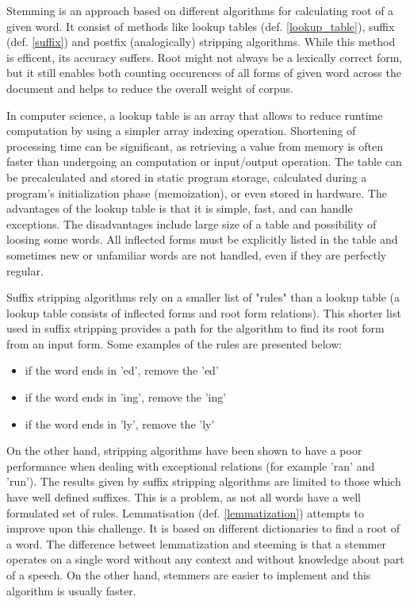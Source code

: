 Stemming is an approach based on different algorithms for calculating root of a given word. It consist of methods like lookup tables (def. \ref{lookup_table}), suffix (def. \ref{suffix}) and postfix (analogically) stripping algorithms. While this method is efficent, its accuracy suffers. Root might not always be a lexically correct form, but it still enables both counting occurences of all forms of given word across the document and helps to reduce the overall weight of corpus.

 \begin{definition}
 	\label{lookup_table}
In computer science, a lookup table is an array that allows to reduce runtime computation by using a simpler array indexing operation. Shortening of processing time can be significant, as retrieving a value from memory is often faster than undergoing an computation or input/output operation. The table can be precalculated and stored in static program storage, calculated during a program's initialization phase (memoization), or even stored in hardware.
The advantages of the lookup table is that it is simple, fast, and can handle exceptions. The disadvantages include large size of a table and possibility of loosing some words. All inflected forms must be explicitly listed in the table and sometimes new or unfamiliar words are not handled, even if they are perfectly regular. 
\end{definition}

 \begin{definition}
 	\label{suffix}
Suffix stripping algorithms rely on a smaller list of "rules" than a lookup table (a lookup table consists of inflected forms and root form relations). This shorter list used in suffix stripping provides a path for the algorithm to find its root form from an input form. Some examples of the rules are presented below:
\begin{itemize}
	\item if the word ends in 'ed', remove the 'ed'
	\item if the word ends in 'ing', remove the 'ing'
	\item if the word ends in 'ly', remove the 'ly'
\end{itemize}
 \end{definition}

 On the other hand, stripping algorithms have been shown to have a poor performance when dealing with exceptional relations (for example 'ran' and 'run'). The results given by suffix stripping algorithms are limited to those which have well defined suffixes. This is a problem, as not all words have a well formulated set of rules. Lemmatisation (def. \ref{lemmatization}) attempts to improve upon this challenge.
It is based on different dictionaries to find a root of a word. The difference betweet lemmatization and steeming is that a stemmer operates on a single word without any context and without knowledge about part of a speech. On the other hand, stemmers are easier to implement and this algorithm is usually faster.


